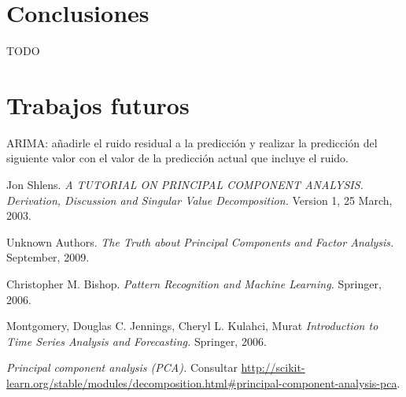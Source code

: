 \documentclass[11pt,spanish,listoffigures,listoftables]{tfgetsinf}
\begin{document}
 
\chapter{Conclusiones}
TODO

\chapter{Trabajos futuros}

ARIMA: añadirle el ruido residual a la predicción y realizar la predicción del siguiente valor con el valor de la predicción actual que incluye el ruido.

\begin{thebibliography}{10}

   Jon Shlens.
   \newblock \textit{A TUTORIAL ON PRINCIPAL COMPONENT ANALYSIS. Derivation, Discussion and Singular Value Decomposition.}
   \newblock Version 1, 25 March, 2003.

   Unknown Authors.
   \newblock \textit{The Truth about Principal Components and Factor Analysis.}
    September, 2009.
   
   Christopher M. Bishop.
   \newblock \textit{Pattern Recognition and Machine Learning.}
   \newblock Springer, 2006.

   Montgomery, Douglas C.
   Jennings, Cheryl L.
   Kulahci, Murat
   \newblock \textit{Introduction to Time Series Analysis and Forecasting.}
   \newblock Springer, 2006.

   \textit{Principal component analysis (PCA).}
   \newblock Consultar 
   \url{http://scikit-learn.org/stable/modules/decomposition.html#principal-component-analysis-pca}.

\end{thebibliography}
\cleardoublepage

%
\end{document}
